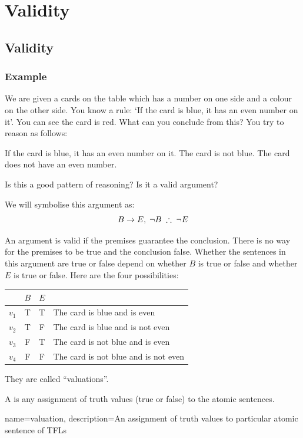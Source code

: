 \chapter{Validity}

\section{Validity}
\subsection{Example}
We are given a cards on the table which has a number on one side and a colour on the other side. You know a rule: `If the card is blue, it has an even number on it'. You can see the card is red. What can you conclude from this? You try to reason as follows: 
\begin{earg}
\prem If the card is blue, it has an even number on it. 
\prem The card is not blue.
\conc The card does not have an even number.
\end{earg}
Is this a good pattern of reasoning? Is it a valid argument? 

We will symbolise this argument as: $$B\eif E,\; \enot B\; \therefore\; \enot E$$

An argument is valid if the premises guarantee the conclusion. There is no way for the premises to be true and the conclusion false. 
Whether the sentences in this argument are true or false depend on whether $B$ is true or false and whether $E$ is true or false. Here are the four possibilities: 
\begin{center}
	\begin{tabular}{rccl}
		&$B$&$E$\\\hline
		$v_1$&T&T&The card is blue and is even\\
		$v_2$&T&F&The card is blue and is not even\\
		$v_3$&F&T&The card is not blue and is even\\
		$v_4$&F&F&The card is not blue and is not even\\
	\end{tabular}
\end{center}
They are called ``valuations''. 

\begin{definition}
		A  is any assignment of truth values (true or false) to the atomic sentences.
	\end{definition}

{
name=valuation,
description={An assignment of \glspl{truth value} to particular atomic \glspl{sentence of TFL}}
}

